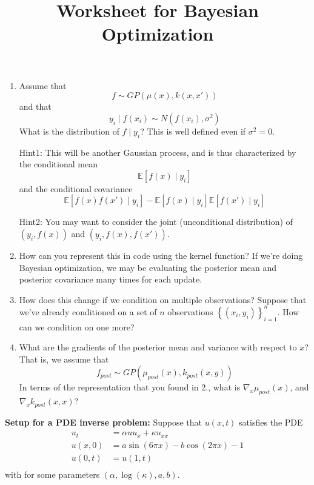 \documentclass[11pt]{article}
\title{Worksheet for Bayesian Optimization}
\author{}
\date{}
\begin{document}
\vspace{-2cm}
\maketitle
\vspace{-2cm}
\begin{enumerate}
    \item Assume that 
    \[
        f \sim GP\left(\mu(x), k(x,x')\right)
    \]
    and that 
    \[
        y_{i} \mid f(x_i) \sim N\left(f(x_{i}), \sigma^{2}\right)
    \]
    What is the distribution of $f\mid y_{i}$? This is well defined even if $\sigma^{2}=0$.

    Hint1: This will be another Gaussian process, and is thus characterized by the conditional mean
    \begin{equation*}
        \mathbb{E}\left[f(x) \mid y_{i}\right]
    \end{equation*}
    and the conditional covariance
    \begin{equation*}
        \mathbb{E}\left[f(x)f(x') \mid y_{i}\right] - \mathbb{E}\left[f(x) \mid y_{i}\right]\mathbb{E}\left[f(x') \mid y_{i}\right]
    \end{equation*}

    Hint2: You may want to consider the joint (unconditional distribution) of $(y_i,f(x))$ and $(y_i,f(x),f(x'))$.



    \vspace{3cm}

    \item How can you represent this in code using the kernel function? 
    If we're doing Bayesian optimization, we may be evaluating the posterior mean 
    and posterior covariance many times for each update. 

    \vspace{3cm}

    \item How does this change if we condition on multiple observations? Suppose that 
    we've already conditioned on a set of $n$ observations $\left\{(x_{i},y_{i})\right\}_{i=1}^{n}$. 
    How can we condition on one more?

    \vspace{3cm}

    \item What are the gradients of the posterior mean and variance with respect to $x$? 
    That is, we assume that 
    \[
        f_{post} \sim GP\left(\mu_{post}(x), k_{post}(x,y)\right)
    \]
    In terms of the representation that you found in 2., what is $\nabla_{x}\mu_{post}(x)$,
    and $\nabla_{x}k_{post}(x,x)$?

\end{enumerate}
\newpage
\textbf{Setup for a PDE inverse problem:} Suppose that $u(x,t)$ satisfies the PDE
\begin{align}
    u_t &= \alpha u u_{x} + \kappa u_{xx} \\
    u(x,0)&= a \sin(6\pi x) - b \cos(2\pi x) -1\\
    u(0,t) &= u(1,t)\\
\end{align}
with for some parameters $(\alpha,\log(\kappa),a,b)$. 
\end{document}
